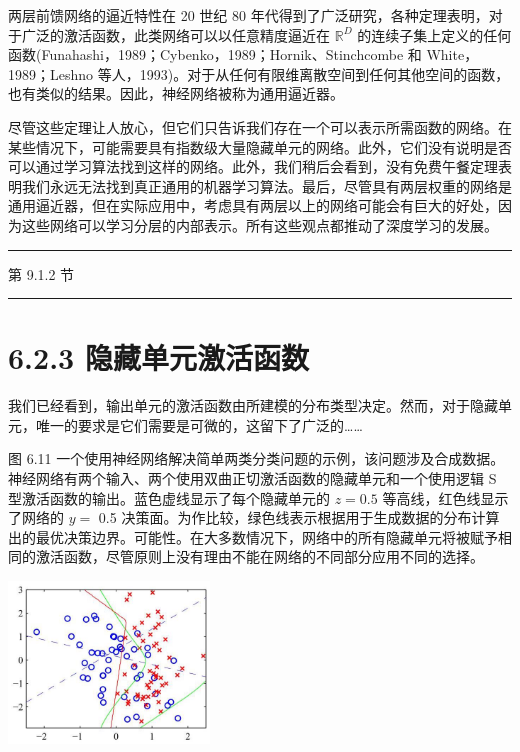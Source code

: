 \documentclass[10pt]{article}
\newcommand{\HRule}{\begin{center}\rule{0.9\linewidth}{0.2mm}\end{center}}
\begin{document}
两层前馈网络的逼近特性在 20 世纪 80 年代得到了广泛研究，各种定理表明，对于广泛的激活函数，此类网络可以以任意精度逼近在 \({\mathbb{R}}^{D}\) 的连续子集上定义的任何函数(Funahashi，1989；Cybenko，1989；Hornik、Stinchcombe 和 White，1989；Leshno 等人，1993)。对于从任何有限维离散空间到任何其他空间的函数，也有类似的结果。因此，神经网络被称为通用逼近器。

尽管这些定理让人放心，但它们只告诉我们存在一个可以表示所需函数的网络。在某些情况下，可能需要具有指数级大量隐藏单元的网络。此外，它们没有说明是否可以通过学习算法找到这样的网络。此外，我们稍后会看到，没有免费午餐定理表明我们永远无法找到真正通用的机器学习算法。最后，尽管具有两层权重的网络是通用逼近器，但在实际应用中，考虑具有两层以上的网络可能会有巨大的好处，因为这些网络可以学习分层的内部表示。所有这些观点都推动了深度学习的发展。

\HRule

第 9.1.2 节

\HRule

\section*{6.2.3 隐藏单元激活函数}

我们已经看到，输出单元的激活函数由所建模的分布类型决定。然而，对于隐藏单元，唯一的要求是它们需要是可微的，这留下了广泛的……

图 6.11 一个使用神经网络解决简单两类分类问题的示例，该问题涉及合成数据。神经网络有两个输入、两个使用双曲正切激活函数的隐藏单元和一个使用逻辑 S 型激活函数的输出。蓝色虚线显示了每个隐藏单元的 \(z = {0.5}\) 等高线，红色线显示了网络的 \(y =\) 0.5 决策面。为作比较，绿色线表示根据用于生成数据的分布计算出的最优决策边界。可能性。在大多数情况下，网络中的所有隐藏单元将被赋予相同的激活函数，尽管原则上没有理由不能在网络的不同部分应用不同的选择。

\begin{center}
\includegraphics[max width=0.4\textwidth]{images/0194e279-9b28-703a-88f4-c3ac21e2010d_202_944_359_570_460_0.jpg}
\end{center}
\hspace*{3em} 
\end{document}

